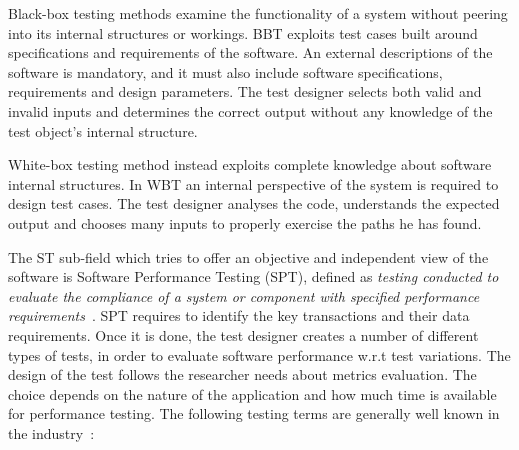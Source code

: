 Black-box testing  methods  examine the functionality of a system without peering into its internal structures or workings. BBT exploits test cases built around specifications and requirements of the software. An external descriptions of the software is mandatory, and it must also include software specifications, requirements and design parameters.  The test designer selects both valid and invalid inputs and determines the correct output without any knowledge of the test object's internal structure.

White-box testing  method instead exploits complete knowledge about software internal structures. In WBT an internal perspective of the system is required to design test cases. The test designer analyses the code, understands the expected output and chooses many inputs to properly exercise the paths he has found. 

The ST sub-field which tries to offer an objective and independent view of the software is Software Performance Testing (SPT), defined as  \textit{testing conducted to evaluate the compliance of a system or component with specified performance requirements}~\cite{IEEEStd610.12-1990:glossary}. SPT requires to identify the key transactions and their data requirements. Once it is done, the test designer creates a number of different types of tests, in order to evaluate software performance w.r.t test variations. The design of the test follows the researcher needs about metrics evaluation. The choice depends on the nature of the application and how much time is available for performance testing. The following testing terms are generally well known in the industry~\cite{Molyneaux:2009:AAP:1550832}:

